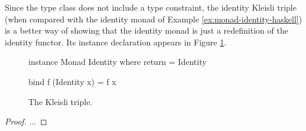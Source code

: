 \begin{example}
  \label{ex:triple-identity-haskell}

  Since the  type class does not include a
   type constraint, the identity Kleisli triple
  (when compared with the identity monad of Example
  \ref{ex:monad-identity-haskell}) is a better way of showing that the
  identity monad is just a redefinition of the identity functor. Its
  instance declaration appears in Figure
  \ref{fig:triple-identity-haskell}.

  \begin{figure}[htbp]
    \begin{codehaskell}
instance Monad Identity where
  return = Identity

  bind f (Identity x) = f x
    \end{codehaskell}
    \caption{The  Kleisli triple.}
    \label{fig:triple-identity-haskell}
  \end{figure}

  \begin{proof}
    ...
  \end{proof}
\end{example}

